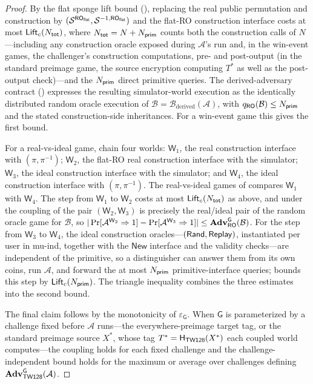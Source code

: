 \begin{proof}
By the flat sponge lift bound (), replacing the real
public permutation and \TW{} construction by
$(\mathcal{S}^{\mathsf{RO}_{\mathsf{flat}}},\mathcal{S}^{-1,\mathsf{RO}_{\mathsf{flat}}})$ and the flat-RO construction
interface costs at most $\mathsf{Lift}_c(N_{\mathsf{tot}})$, where $N_{\mathsf{tot}} = N + N_{\mathsf{prim}}$
counts both the construction calls of $N$---including any construction
oracle exposed during $\mathcal{A}$'s run and, in the win-event games,
the challenger's construction computations, pre- and post-output (in the
standard preimage game, the source encryption computing $T^*$ as well as the
post-output check)---and the
$N_{\mathsf{prim}}$ direct primitive queries. The derived-adversary contract
() expresses the resulting simulator-world
execution as the identically distributed random oracle execution of
$\mathcal{B} = \mathcal{B}_{\mathrm{derived}}(\mathcal{A})$, with
$q_{\mathsf{RO}}(\mathcal{B}) \leq N_{\mathsf{prim}}$ and the stated construction-side
inheritances. For a win-event game this gives the first bound.

For a real-vs-ideal game, chain four worlds:
$\mathsf{W}_1$, the real construction interface with $(\pi,\pi^{-1})$;
$\mathsf{W}_2$, the flat-RO real construction interface with the
simulator; $\mathsf{W}_3$, the ideal construction interface with the
simulator; and $\mathsf{W}_4$, the ideal construction interface with
$(\pi,\pi^{-1})$. The real-vs-ideal games of
compares $\mathsf{W}_1$ with $\mathsf{W}_4$. The step from
$\mathsf{W}_1$ to $\mathsf{W}_2$ costs at most $\mathsf{Lift}_c(N_{\mathsf{tot}})$ as
above, and under the coupling of  the pair
$(\mathsf{W}_2, \mathsf{W}_3)$ is precisely the real/ideal pair of the
random oracle game for $\mathcal{B}$, so
$|\Pr[\mathcal{A}^{\mathsf{W}_2} \Rightarrow 1] -
\Pr[\mathcal{A}^{\mathsf{W}_3} \Rightarrow 1]| \leq
\mathbf{Adv}^{\mathsf{G}}_{\mathsf{RO}}(\mathcal{B})$. For the step from $\mathsf{W}_3$
to $\mathsf{W}_4$, the ideal construction oracles---$(\mathsf{Rand},\mathsf{Replay})$,
instantiated per user in mu-ind, together with the $\mathsf{New}$
interface and the validity checks---are independent of the primitive, so
a distinguisher can answer them from its own coins, run $\mathcal{A}$,
and forward the at most $N_{\mathsf{prim}}$ primitive-interface queries;
 bounds this step by $\mathsf{Lift}_c(N_{\mathsf{prim}})$.
The triangle inequality combines the three estimates into the second
bound.

The final claim follows by the
monotonicity of $\varepsilon_{\mathsf{G}}$. When $\mathsf{G}$ is
parameterized by a challenge fixed before $\mathcal{A}$ runs---the
everywhere-preimage target tag, or the standard preimage source $X^*$,
whose tag $T^* = \mathsf{H}_{\mathsf{TW128}}(X^*)$ each coupled world computes---the coupling
holds for each fixed challenge and the challenge-independent bound holds
for the maximum or average over challenges defining
$\mathbf{Adv}^{\mathsf{G}}_{\textsf{TW128}}(\mathcal{A})$.
\end{proof}
